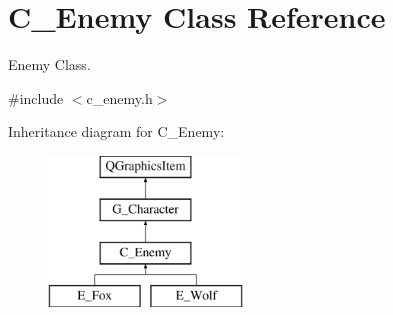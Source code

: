 \hypertarget{class_c___enemy}{}\section{C\+\_\+\+Enemy Class Reference}
\label{class_c___enemy}


Enemy Class.  




{\ttfamily \#include $<$c\+\_\+enemy.\+h$>$}

Inheritance diagram for C\+\_\+\+Enemy\+:\begin{figure}[H]
\begin{center}
\leavevmode
\includegraphics[height=4.000000cm]{class_c___enemy}
\end{center}
\end{figure}
